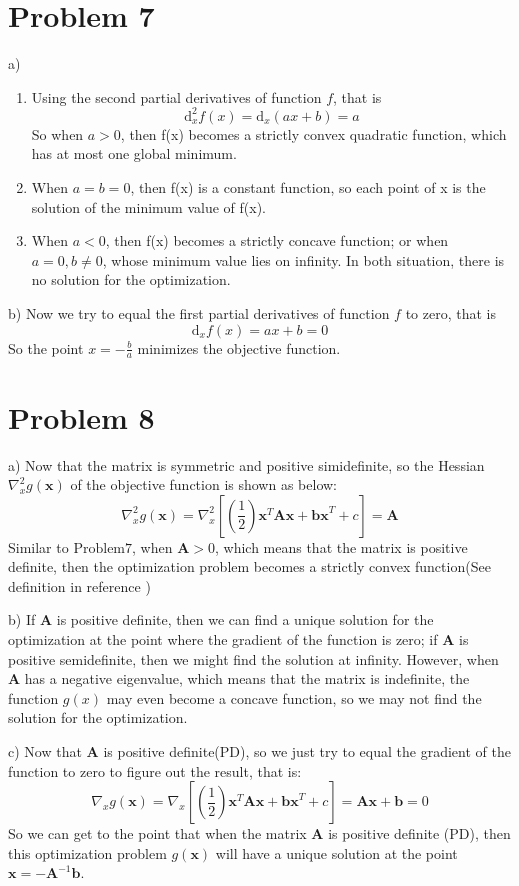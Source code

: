 \documentclass{article}
\begin{document}
\section*{Problem 7}
a)
\begin{enumerate}
	\item Using the second partial derivatives of function $f$, that is
	\[ \mathrm{d}_x^2 f(x) = \mathrm{d}_x(ax+b) = a\]
	So when $a>0$, then f(x) becomes a strictly convex quadratic function, which has at most one global minimum.\\
	
	\item When $a=b=0$, then f(x) is a constant function, so each point of x is the solution of the minimum value of f(x).\\
	
	\item When $a<0$, then f(x) becomes a strictly concave function; or when $a=0,b\not =0$, whose minimum value lies on infinity. In both situation, there is no solution for the optimization.\\
\end{enumerate}
b) Now we try to equal the first partial derivatives of function $f$ to zero, that is 
\[ \mathrm{d}_x f(x) = ax+b = 0\]
So the point $ x = -\frac{b}{a} $ minimizes the objective function. 

\section*{Problem 8}
a) Now that the matrix is symmetric and positive simidefinite, so the Hessian $\nabla_x^2 g(\bm{x})$ of the objective function is shown as below:
\[ \nabla_x^2 g(\bm{x}) = \nabla_x^2[(\frac{1}{2})\bm{x}^T\bm{A}\bm{x} + \bm{bx}^T + c] = \bm{A} \]
Similar to $\bm{\mathrm{Problem 7}}$, when $\bm{A} > 0$, which means that the matrix is positive definite, then the optimization problem becomes a strictly convex function(See definition in reference \cite{ConvexFuction})

b) If $\bm{A}$ is positive definite, then we can find a unique solution for the optimization at the point where the gradient of the function is zero; if $\bm{A}$ is positive semidefinite, then we might find the solution at infinity. However, when $\bm{A}$ has a negative eigenvalue, which means that the matrix is indefinite, the function $g(x)$ may even become a concave function, so we may not find the solution for the optimization. 

c) Now that $\bm{A}$ is positive definite(PD), so we just try to equal the gradient of the function to zero to figure out the result, that is:
\[ \nabla_x g(\bm{x}) = \nabla_x [(\frac{1}{2})\bm{x}^T\bm{A}\bm{x} + \bm{bx}^T + c] = \bm{Ax} + \bm{b} = 0 \] 
So we can get to the point that when the matrix $\bm{A}$ is positive definite (PD), then this optimization problem $g(\bm{x})$ will have a unique solution at the point $\bm{x}=-\bm{A}^{-1}\bm{b}$.
\end{document}
